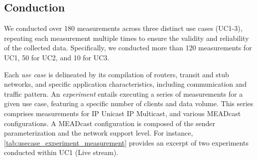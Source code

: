 
\subsection{Conduction} %
\label{sub:Conduction}

We conducted over 180 measurements across three distinct use cases (UC1-3),
    repeating each measurement multiple times to ensure the validity and
    reliability of the collected data.
Specifically, we conducted more than 120 measurements for UC1, 50 for UC2, and
    10 for UC3.

Each \textit{use case} is delineated by its compilation of routers, transit and
    stub networks, and specific application characteristics, including
    communication and traffic pattern.
An \textit{experiment} entails executing a series of measurements for a given
    use case, featuring a specific number of clients and data volume.
This series comprises measurements for IP Unicast IP Multicast, and various 
    MEADcast configurations.
A MEADcast configuration is composed of the sender parameterization and the 
    network support level.
For instance, \autoref{tab:usecase_experiment_measurement} provides an excerpt
    of two experiments conducted within UC1 (Live stream).

